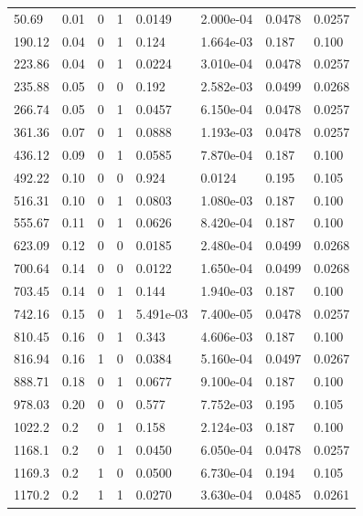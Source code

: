 \documentclass[preview]{standalone}
\begin{document}
{{\begin{tabular}{L{1.2cm}C{1.2cm} C{0.3cm}C{0.5cm} C{1.4cm}C{1.4cm} C{1.4cm}C{1.4cm}}
  50.69  &  0.01  & 0     &  1 &  0.0149  & 2.000e-04  & 0.0478 &  0.0257   \\ 
  190.12  &  0.04  & 0     &  1 &  0.124  & 1.664e-03  & 0.187 &  0.100   \\ 
  223.86  &  0.04  & 0     &  1 &  0.0224  & 3.010e-04  & 0.0478 &  0.0257   \\ 
  235.88  &  0.05  & 0     &  0 &  0.192  & 2.582e-03  & 0.0499 &  0.0268   \\ 
  266.74  &  0.05  & 0     &  1 &  0.0457  & 6.150e-04  & 0.0478 &  0.0257   \\ 
  361.36  &  0.07  & 0     &  1 &  0.0888  & 1.193e-03  & 0.0478 &  0.0257   \\ 
  436.12  &  0.09  & 0     &  1 &  0.0585  & 7.870e-04  & 0.187 &  0.100   \\ 
  492.22  &  0.10  & 0     &  0 &  0.924  & 0.0124  & 0.195 &  0.105   \\ 
  516.31  &  0.10  & 0     &  1 &  0.0803  & 1.080e-03  & 0.187 &  0.100   \\ 
  555.67  &  0.11  & 0     &  1 &  0.0626  & 8.420e-04  & 0.187 &  0.100   \\ 
  623.09  &  0.12  & 0     &  0 &  0.0185  & 2.480e-04  & 0.0499 &  0.0268   \\ 
  700.64  &  0.14  & 0     &  0 &  0.0122  & 1.650e-04  & 0.0499 &  0.0268   \\ 
  703.45  &  0.14  & 0     &  1 &  0.144  & 1.940e-03  & 0.187 &  0.100   \\ 
  742.16  &  0.15  & 0     &  1 &  5.491e-03  & 7.400e-05  & 0.0478 &  0.0257   \\ 
  810.45  &  0.16  & 0     &  1 &  0.343  & 4.606e-03  & 0.187 &  0.100   \\ 
  816.94  &  0.16  & 1     &  0 &  0.0384  & 5.160e-04  & 0.0497 &  0.0267   \\ 
  888.71  &  0.18  & 0     &  1 &  0.0677  & 9.100e-04  & 0.187 &  0.100   \\ 
  978.03  &  0.20  & 0     &  0 &  0.577  & 7.752e-03  & 0.195 &  0.105   \\ 
  1022.2  &   0.2  & 0     &  1 &  0.158  & 2.124e-03  & 0.187 &  0.100   \\ 
  1168.1  &   0.2  & 0     &  1 &  0.0450  & 6.050e-04  & 0.0478 &  0.0257   \\ 
  1169.3  &   0.2  & 1     &  0 &  0.0500  & 6.730e-04  & 0.194 &  0.105   \\ 
  1170.2  &   0.2  & 1     &  1 &  0.0270  & 3.630e-04  & 0.0485 &  0.0261   \\ 

\end{tabular}}}
\end{document}
